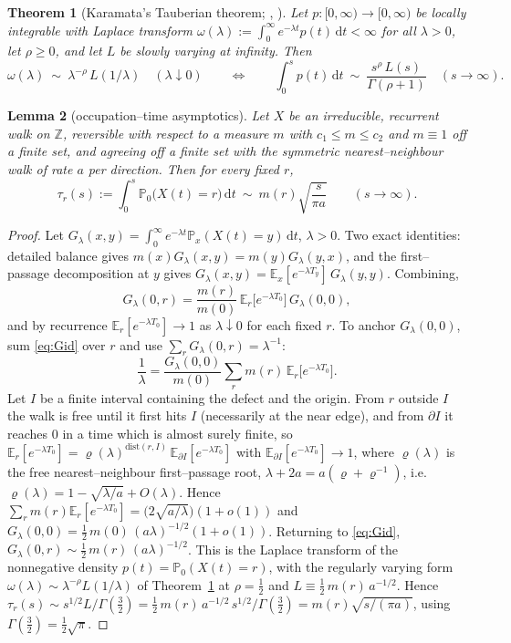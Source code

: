 \documentclass[11pt]{article}
\theoremstyle{plain}
\newtheorem{theorem}{Theorem}[section]
\newtheorem{lemma}[theorem]{Lemma}
\theoremstyle{definition}
\theoremstyle{remark}
\newcommand{\Z}{\mathbb{Z}}\newcommand{\R}{\mathbb{R}}\newcommand{\N}{\mathbb{N}}
\newcommand{\E}{\mathbb{E}}\newcommand{\PP}{\mathbb{P}}\newcommand{\dd}{\,\mathrm{d}}
\begin{document}
\begin{theorem}[Karamata's Tauberian theorem; {\cite[Thm.~1.7.1$'$]{BGT}}, {\cite[\S XIII.5]{Feller2}}]
\label{thm:karamata}
Let $p:[0,\infty)\to[0,\infty)$ be locally integrable with Laplace transform
$\omega(\lambda):=\int_0^\infty e^{-\lambda t}p(t)\dd t<\infty$ for all $\lambda>0$, let
$\rho\ge0$, and let $L$ be slowly varying at infinity. Then
\[
  \omega(\lambda)\ \sim\ \lambda^{-\rho}\,L(1/\lambda)\quad(\lambda\downarrow0)
  \qquad\Longleftrightarrow\qquad
  \int_0^s p(t)\dd t\ \sim\ \frac{s^{\rho}\,L(s)}{\Gamma(\rho+1)}\quad(s\to\infty).
\]
\end{theorem}

\begin{lemma}[occupation--time asymptotics]\label{lem:tau}
Let $X$ be an irreducible, recurrent walk on $\Z$, reversible with respect to a
measure $m$ with $c_1\le m\le c_2$ and $m\equiv1$ off a finite set, and agreeing off a
finite set with the symmetric nearest--neighbour walk of rate $a$ per direction. Then
for every fixed $r$,
\[
  \tau_r(s):=\int_0^s\PP_0\big(X(t)=r\big)\dd t\ \sim\ m(r)\sqrt{\frac{s}{\pi a}}
  \qquad(s\to\infty).
\]
\end{lemma}
\begin{proof}
Let $G_\lambda(x,y)=\int_0^\infty e^{-\lambda t}\PP_x(X(t)=y)\dd t$, $\lambda>0$. Two
exact identities: detailed balance gives $m(x)G_\lambda(x,y)=m(y)G_\lambda(y,x)$, and
the first--passage decomposition at $y$ gives
$G_\lambda(x,y)=\E_x[e^{-\lambda T_y}]\,G_\lambda(y,y)$. Combining,
\begin{equation}\label{eq:Gid}
  G_\lambda(0,r)=\frac{m(r)}{m(0)}\,\E_r\big[e^{-\lambda T_0}\big]\,G_\lambda(0,0),
\end{equation}
and by recurrence $\E_r[e^{-\lambda T_0}]\to1$ as $\lambda\downarrow0$ for each fixed
$r$. To anchor $G_\lambda(0,0)$, sum \eqref{eq:Gid} over $r$ and use
$\sum_rG_\lambda(0,r)=\lambda^{-1}$:
\[
  \frac1\lambda=\frac{G_\lambda(0,0)}{m(0)}\sum_r m(r)\,\E_r\big[e^{-\lambda T_0}\big].
\]
Let $I$ be a finite interval containing the defect and the origin. From $r$ outside
$I$ the walk is free until it first hits $I$ (necessarily at the near edge), and from
$\partial I$ it reaches $0$ in a time which is almost surely finite, so
$\E_r[e^{-\lambda T_0}]=\varrho(\lambda)^{\mathrm{dist}(r,I)}\,
\E_{\partial I}[e^{-\lambda T_0}]$ with $\E_{\partial I}[e^{-\lambda T_0}]\to1$, where
$\varrho(\lambda)$ is the free nearest--neighbour first--passage root,
$\lambda+2a=a(\varrho+\varrho^{-1})$, i.e.\
$\varrho(\lambda)=1-\sqrt{\lambda/a}+O(\lambda)$. Hence
$\sum_rm(r)\E_r[e^{-\lambda T_0}]=\big(2\sqrt{a/\lambda}\big)(1+o(1))$ and
$G_\lambda(0,0)=\tfrac12\,m(0)\,(a\lambda)^{-1/2}(1+o(1))$. Returning to
\eqref{eq:Gid}, $G_\lambda(0,r)\sim\tfrac12\,m(r)\,(a\lambda)^{-1/2}$. This is the
Laplace transform of the nonnegative density $p(t)=\PP_0(X(t)=r)$, with the regularly
varying form $\omega(\lambda)\sim\lambda^{-\rho}L(1/\lambda)$ of
Theorem~\ref{thm:karamata} at $\rho=\tfrac12$ and $L\equiv\tfrac12\,m(r)\,a^{-1/2}$.
Hence $\tau_r(s)\sim s^{1/2}L/\Gamma(\tfrac32)=\tfrac12\,m(r)\,a^{-1/2}\,s^{1/2}/\Gamma(\tfrac32)
=m(r)\sqrt{s/(\pi a)}$, using $\Gamma(\tfrac32)=\tfrac12\sqrt\pi$.
\end{proof}
\end{document}
